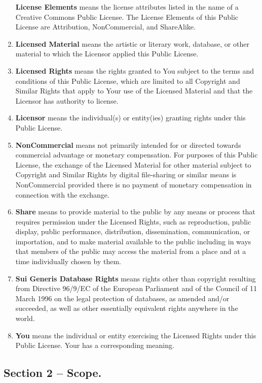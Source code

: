 \documentclass[]{book}
\begin{document}
\begin{enumerate}
  \textbf{License Elements} means the license attributes listed in the
  name of a Creative Commons Public License. The License Elements of
  this Public License are Attribution, NonCommercial, and ShareAlike.
\item
  \textbf{Licensed Material} means the artistic or literary work,
  database, or other material to which the Licensor applied this Public
  License.
\item
  \textbf{Licensed Rights} means the rights granted to You subject to
  the terms and conditions of this Public License, which are limited to
  all Copyright and Similar Rights that apply to Your use of the
  Licensed Material and that the Licensor has authority to license.
\item
  \textbf{Licensor} means the individual(s) or entity(ies) granting
  rights under this Public License.
\item
  \textbf{NonCommercial} means not primarily intended for or directed
  towards commercial advantage or monetary compensation. For purposes of
  this Public License, the exchange of the Licensed Material for other
  material subject to Copyright and Similar Rights by digital
  file-sharing or similar means is NonCommercial provided there is no
  payment of monetary compensation in connection with the exchange.
\item
  \textbf{Share} means to provide material to the public by any means or
  process that requires permission under the Licensed Rights, such as
  reproduction, public display, public performance, distribution,
  dissemination, communication, or importation, and to make material
  available to the public including in ways that members of the public
  may access the material from a place and at a time individually chosen
  by them.
\item
  \textbf{Sui Generis Database Rights} means rights other than copyright
  resulting from Directive 96/9/EC of the European Parliament and of the
  Council of 11 March 1996 on the legal protection of databases, as
  amended and/or succeeded, as well as other essentially equivalent
  rights anywhere in the world.
\item
  \textbf{You} means the individual or entity exercising the Licensed
  Rights under this Public License. Your has a corresponding meaning.
\end{enumerate}

\subsection{Section 2 -- Scope.}\label{section-2-scope.}
\end{document}
